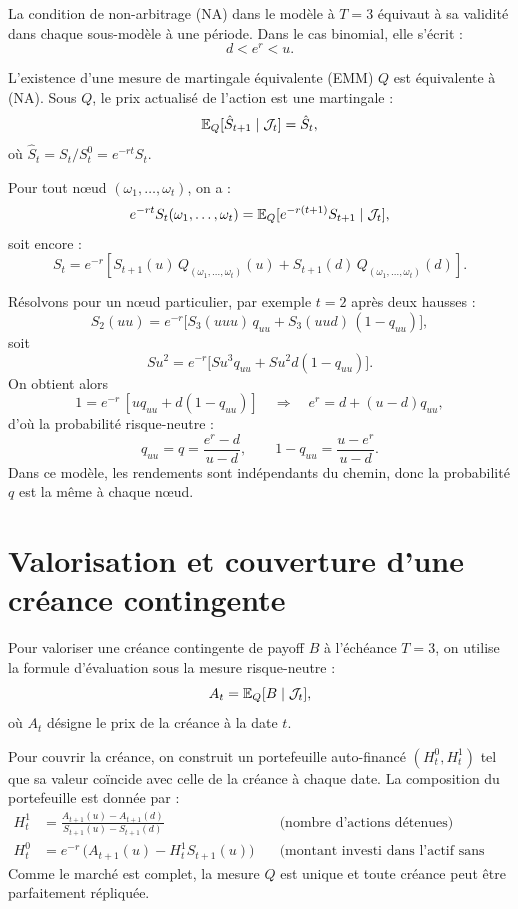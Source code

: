 La condition de non-arbitrage (NA) dans le modèle à $T=3$ équivaut à sa validité dans chaque sous-modèle à une période.  
Dans le cas binomial, elle s'écrit :
\begin{equation}
d < e^r < u.
\end{equation}

L'existence d'une mesure de martingale équivalente (EMM) $Q$ est équivalente à (NA).  
Sous $Q$, le prix actualisé de l'action est une martingale :
\begin{equation}
\mathbb{E}_Q[\hat{S}_{t+1} \mid \mathcal{J}_t] = \hat{S}_t,
\end{equation}
où $\hat{S}_t = S_t / S_t^0 = e^{-rt} S_t$.

Pour tout nœud $(\omega_1, \dots, \omega_t)$, on a :
\[
e^{-rt} S_t(\omega_1, \dots, \omega_t)
= \mathbb{E}_Q[e^{-r(t+1)} S_{t+1} \mid \mathcal{J}_t],
\]
soit encore :
\[
S_t = e^{-r} \left[ S_{t+1}(u)\, Q_{(\omega_1,\dots,\omega_t)}(u)
+ S_{t+1}(d)\, Q_{(\omega_1,\dots,\omega_t)}(d) \right].
\]

Résolvons pour un nœud particulier, par exemple $t=2$ après deux hausses :
\[
S_2(uu) = e^{-r} \big[S_3(uuu)\, q_{uu} + S_3(uud)\,(1-q_{uu})\big],
\]
soit
\[
S u^2 = e^{-r} \big[S u^3 q_{uu} + S u^2 d (1-q_{uu})\big].
\]
On obtient alors
\[
1 = e^{-r}\,[u q_{uu} + d(1-q_{uu})]
\quad\Rightarrow\quad
e^r = d + (u-d) q_{uu},
\]
d'où la probabilité risque-neutre :
\[
q_{uu} = q = \frac{e^r - d}{u - d}, \qquad
1-q_{uu} = \frac{u - e^r}{u - d}.
\]
Dans ce modèle, les rendements sont indépendants du chemin, donc la probabilité $q$ est la même à chaque nœud.

\section{Valorisation et couverture d'une créance contingente}

Pour valoriser une créance contingente de payoff $B$ à l'échéance $T=3$, on utilise la formule d'évaluation sous la mesure risque-neutre :
\begin{equation}
A_t = \mathbb{E}_Q[B \mid \mathcal{J}_t],
\end{equation}
où $A_t$ désigne le prix de la créance à la date $t$.

Pour couvrir la créance, on construit un portefeuille auto-financé $(H_t^0,H_t^1)$ tel que sa valeur coïncide avec celle de la créance à chaque date.  
La composition du portefeuille est donnée par :
\begin{align}
H_t^1 &= \frac{A_{t+1}(u) - A_{t+1}(d)}{S_{t+1}(u) - S_{t+1}(d)}
\quad &\text{(nombre d'actions détenues)}\\
H_t^0 &= e^{-r}\,\big(A_{t+1}(u) - H_t^1 S_{t+1}(u)\big)
\quad &\text{(montant investi dans l'actif sans risque).}
\end{align}
Comme le marché est complet, la mesure $Q$ est unique et toute créance peut être parfaitement répliquée.


